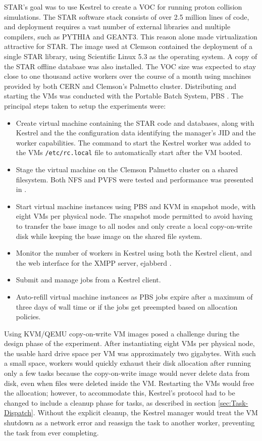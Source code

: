 STAR's goal was to use Kestrel to create a VOC for running proton
collision simulations. The STAR software stack consists of over 2.5
million lines of code, and deployment requires a vast number of external
libraries and multiple compilers, such as PYTHIA and GEANT3. This
reason alone made virtualization attractive for STAR. The image used
at Clemson contained the deployment of a single STAR library, using
Scientific Linux 5.3 as the operating system. A copy of the STAR offline
database was also installed. The VOC size was expected to stay close
to one thousand active workers over the course of a month using machines
provided by both CERN and Clemson's Palmetto cluster. Distributing
and starting the VMs was conducted with the Portable Batch System,
PBS \cite{PBS}. The principal steps taken to setup the experiments
were:
\begin{itemize}
\item Create virtual machine containing the STAR code and databases, along
with Kestrel and the the configuration data identifying the manager's
JID and the worker capabilities. The command to start the Kestrel
worker was added to the VMs \texttt{/etc/rc.local} file to automatically
start after the VM booted.
\item Stage the virtual machine on the Clemson Palmetto cluster on a shared
filesystem. Both NFS and PVFS were tested and performance was presented
in \cite{Stout10}.
\item Start virtual machine instances using PBS and KVM in snapshot mode,
with eight VMs per physical node. The snapshot mode permitted to avoid
having to transfer the base image to all nodes and only create a local
copy-on-write disk while keeping the base image on the shared file
system.
\item Monitor the number of workers in Kestrel using both the Kestrel client,
and the web interface for the XMPP server, ejabberd \cite{ejabberd}.
\item Submit and manage jobs from a Kestrel client.
\item Auto-refill virtual machine instances as PBS jobs expire after a maximum
of three days of wall time or if the jobs get preempted based on allocation
policies. 
\end{itemize}
Using KVM/QEMU copy-on-write VM images posed a challenge during the
design phase of the experiment. After instantiating eight VMs per
physical node, the usable hard drive space per VM was approximately
two gigabytes. With such a small space, workers would quickly exhaust
their disk allocation after running only a few tasks because the copy-on-write
image would never delete data from disk, even when files were deleted
inside the VM. Restarting the VMs would free the allocation; however,
to accommodate this, Kestrel's protocol had to be changed to include
a cleanup phase for tasks, as described in section \ref{sec:Task-Dispatch}.
Without the explicit cleanup, the Kestrel manager would treat the
VM shutdown as a network error and reassign the task to another worker,
preventing the task from ever completing.


